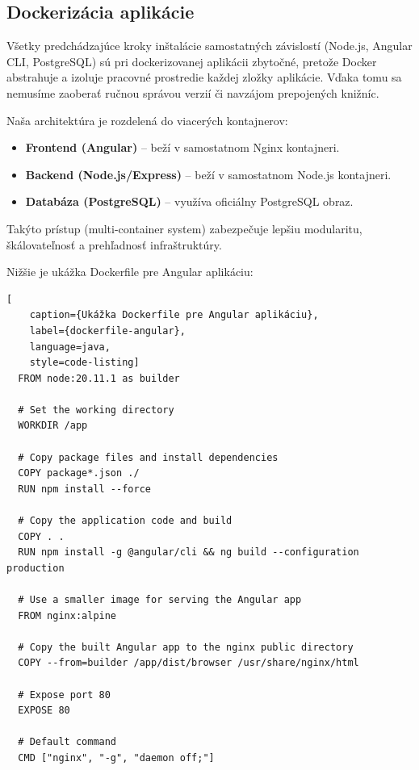   \subsection{Dockerizácia aplikácie}

  Všetky predchádzajúce kroky inštalácie samostatných závislostí (Node.js, Angular CLI, PostgreSQL) sú pri dockerizovanej aplikácii zbytočné, pretože Docker abstrahuje a izoluje pracovné prostredie každej zložky aplikácie. Vďaka tomu sa nemusíme zaoberať ručnou správou verzií či navzájom prepojených knižníc.
  
  Naša architektúra je rozdelená do viacerých kontajnerov:
  \begin{itemize}
    \item \textbf{Frontend (Angular)} – beží v samostatnom Nginx kontajneri.
    \item \textbf{Backend (Node.js/Express)} – beží v samostatnom Node.js kontajneri.
    \item \textbf{Databáza (PostgreSQL)} – využíva oficiálny PostgreSQL obraz.
  \end{itemize}
  
  Takýto prístup (multi-container system) zabezpečuje lepšiu modularitu, škálovateľnosť a prehľadnosť infraštruktúry.
  
  Nižšie je ukážka Dockerfile pre Angular aplikáciu:
  
  \begin{lstlisting}[
    caption={Ukážka Dockerfile pre Angular aplikáciu},
    label={dockerfile-angular},
    language=java,
    style=code-listing]
  FROM node:20.11.1 as builder
  
  # Set the working directory
  WORKDIR /app
  
  # Copy package files and install dependencies
  COPY package*.json ./
  RUN npm install --force
  
  # Copy the application code and build
  COPY . .
  RUN npm install -g @angular/cli && ng build --configuration production
  
  # Use a smaller image for serving the Angular app
  FROM nginx:alpine
  
  # Copy the built Angular app to the nginx public directory
  COPY --from=builder /app/dist/browser /usr/share/nginx/html
  
  # Expose port 80
  EXPOSE 80
  
  # Default command
  CMD ["nginx", "-g", "daemon off;"]
  \end{lstlisting}
  

